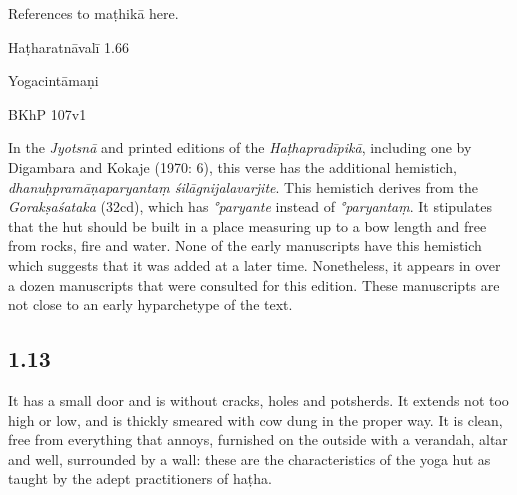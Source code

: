 \begin{ekdosis}
\begin{sources}[hp01_012]
References to maṭhikā here.
\end{sources}

\begin{testimonia}[hp01_012]
Haṭharatnāvalī 1.66

\begin{versinnote}
\end{versinnote}

Yogacintāmaṇi

\begin{versinnote}
\end{versinnote}

BKhP 107v1
\end{testimonia}

\begin{philcomm}[hp01_012]        
In the \emph{Jyotsnā} and printed editions of the \emph{Haṭhapradīpikā}, including one by Digambara and Kokaje (1970: 6), this verse has the additional hemistich, \emph{dhanuḥpramāṇaparyantaṃ śilāgnijalavarjite}. This hemistich derives from the \emph{Gorakṣaśataka} (32cd), which has \emph{°paryante} instead of \emph{°paryantaṃ}. It stipulates that the hut should be built in a place measuring up to a bow length and free from rocks, fire and water. None of the early manuscripts have this hemistich which suggests that it was added at a later time. Nonetheless, it appears in over a dozen manuscripts that were consulted for this edition. These manuscripts are not close to an early hyparchetype of the text.
\end{philcomm}

\subsection*{1.13}
\begin{translation}[hp01_013]
It has a small door and is without cracks, holes and potsherds. It extends not too high or low, and is thickly smeared with cow dung in the proper way. It is clean, free from everything that annoys, furnished on the outside with a verandah, altar and well, surrounded by a wall: these are the characteristics of the yoga hut as taught by the adept practitioners of haṭha.
\end{translation}


\end{ekdosis}

